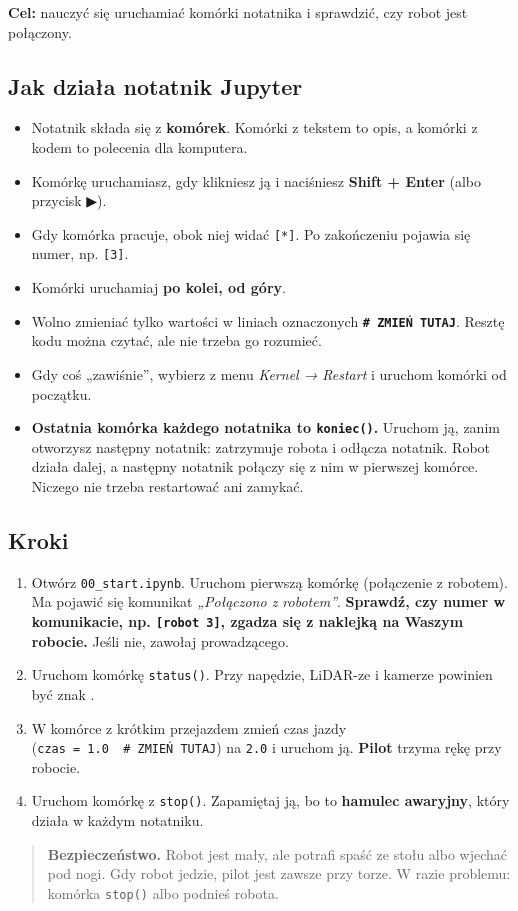 \textbf{Cel:} nauczyć się uruchamiać komórki notatnika i sprawdzić, czy robot jest połączony.

\subsection{Jak działa notatnik Jupyter}\label{jak-dziaux142a-notatnik-jupyter}

\begin{itemize}
\tightlist
\item
  Notatnik składa się z \textbf{komórek}. Komórki z tekstem to opis, a komórki z kodem to polecenia dla komputera.
\item
  Komórkę uruchamiasz, gdy klikniesz ją i naciśniesz \textbf{Shift + Enter} (albo przycisk ▶).
\item
  Gdy komórka pracuje, obok niej widać \texttt{{[}*{]}}. Po zakończeniu pojawia się numer, np. \texttt{{[}3{]}}.
\item
  Komórki uruchamiaj \textbf{po kolei, od góry}.
\item
  Wolno zmieniać tylko wartości w liniach oznaczonych \textbf{\texttt{\#\ ZMIEŃ\ TUTAJ}}. Resztę kodu można czytać, ale nie trzeba go rozumieć.
\item
  Gdy coś „zawiśnie'', wybierz z menu \emph{Kernel → Restart} i uruchom komórki od początku.
\item
  \textbf{Ostatnia komórka każdego notatnika to \texttt{koniec()}.} Uruchom ją, zanim otworzysz następny notatnik: zatrzymuje robota i odłącza notatnik. Robot działa dalej, a następny notatnik połączy się z nim w pierwszej komórce. Niczego nie trzeba restartować ani zamykać.
\end{itemize}

\subsection{Kroki}\label{kroki}

\begin{enumerate}
\def\labelenumi{\arabic{enumi}.}
\tightlist
\item
  Otwórz \texttt{00\_start.ipynb}. Uruchom pierwszą komórkę (połączenie z robotem). Ma pojawić się komunikat \emph{„Połączono z robotem''}. \textbf{Sprawdź, czy numer w komunikacie, np. \texttt{{[}robot 3{]}}, zgadza się z naklejką na Waszym robocie.} Jeśli nie, zawołaj prowadzącego.
\item
  Uruchom komórkę \texttt{status()}. Przy napędzie, LiDAR-ze i kamerze powinien być znak .
\item
  W komórce z krótkim przejazdem zmień czas jazdy (\texttt{czas\ =\ 1.0\ \ \#\ ZMIEŃ\ TUTAJ}) na \texttt{2.0} i uruchom ją. \textbf{Pilot} trzyma rękę przy robocie.
\item
  Uruchom komórkę z \texttt{stop()}. Zapamiętaj ją, bo to \textbf{hamulec awaryjny}, który działa w każdym notatniku.
\end{enumerate}

\begin{quote}
\textbf{Bezpieczeństwo.} Robot jest mały, ale potrafi spaść ze stołu albo wjechać pod nogi. Gdy robot jedzie, pilot jest zawsze przy torze. W razie problemu: komórka \texttt{stop()} albo podnieś robota.
\end{quote}
